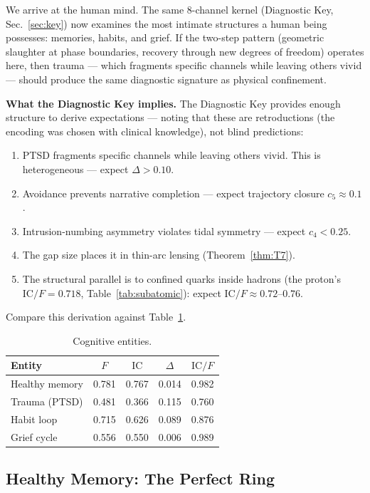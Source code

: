 \documentclass[
  aps,
  prd,
  twocolumn,
  superscriptaddress,
  nofootinbib,
  floatfix
]{revtex4-2}
\newcommand{\IC}{\mathrm{IC}}
\begin{document}
We arrive at the human mind.  The same 8-channel kernel
(Diagnostic Key, Sec.~\ref{sec:key}) now examines the most
intimate structures a human being possesses: memories,
habits, and grief.  If the two-step pattern
(geometric slaughter at phase boundaries, recovery through
new degrees of freedom) operates here, then trauma ---
which fragments specific channels while leaving others
vivid --- should produce the same diagnostic signature
as physical confinement.

\textbf{What the Diagnostic Key implies.}
The Diagnostic Key provides enough structure to derive
expectations --- noting that these are retroductions
(the encoding was chosen with clinical knowledge), not
blind predictions:
\begin{enumerate}
\item PTSD fragments specific channels while leaving others
  vivid.  This is heterogeneous --- expect $\Delta > 0.10$.
\item Avoidance prevents narrative completion --- expect
  trajectory closure $c_5 \approx 0.1$.
\item Intrusion-numbing asymmetry violates tidal symmetry ---
  expect $c_4 < 0.25$.
\item The gap size places it in thin-arc lensing
  (Theorem~\ref{thm:T7}).
\item The structural parallel is to confined quarks inside
  hadrons (the proton's $\IC/F = 0.718$,
  Table~\ref{tab:subatomic}): expect $\IC/F \approx
  0.72$--$0.76$.
\end{enumerate}
Compare this derivation against Table~\ref{tab:cognitive}.

\begin{table}[t]
\caption{\label{tab:cognitive}Cognitive entities.}
\begin{ruledtabular}
\begin{tabular}{lcccc}
Entity & $F$ & $\IC$ & $\Delta$ & $\IC/F$ \\
\hline
Healthy memory     & 0.781 & 0.767 & 0.014 & 0.982 \\
Trauma (PTSD)      & 0.481 & 0.366 & 0.115 & 0.760 \\
Habit loop         & 0.715 & 0.626 & 0.089 & 0.876 \\
Grief cycle        & 0.556 & 0.550 & 0.006 & 0.989 \\
\end{tabular}
\end{ruledtabular}
\end{table}


\subsection{Healthy Memory: The Perfect Ring}
\end{document}
